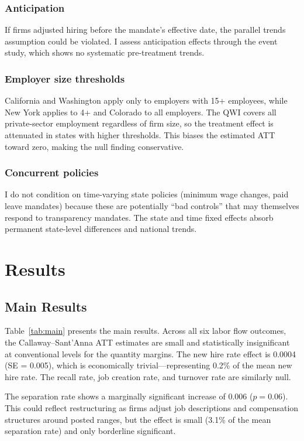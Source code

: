 \documentclass[12pt]{article}
\begin{document}
\subsubsection*{Anticipation} If firms adjusted hiring before the mandate's effective date, the parallel trends assumption could be violated. I assess anticipation effects through the event study, which shows no systematic pre-treatment trends.

\subsubsection*{Employer size thresholds} California and Washington apply only to employers with 15+ employees, while New York applies to 4+ and Colorado to all employers. The QWI covers all private-sector employment regardless of firm size, so the treatment effect is attenuated in states with higher thresholds. This biases the estimated ATT toward zero, making the null finding conservative.

\subsubsection*{Concurrent policies} I do not condition on time-varying state policies (minimum wage changes, paid leave mandates) because these are potentially ``bad controls'' that may themselves respond to transparency mandates. The state and time fixed effects absorb permanent state-level differences and national trends.


\section{Results}

\subsection{Main Results}



Table~\ref{tab:main} presents the main results. Across all six labor flow outcomes, the Callaway--Sant'Anna ATT estimates are small and statistically insignificant at conventional levels for the quantity margins. The new hire rate effect is 0.0004 (SE = 0.005), which is economically trivial---representing 0.2\% of the mean new hire rate. The recall rate, job creation rate, and turnover rate are similarly null.

The separation rate shows a marginally significant increase of 0.006 ($p = 0.06$). This could reflect restructuring as firms adjust job descriptions and compensation structures around posted ranges, but the effect is small (3.1\% of the mean separation rate) and only borderline significant.
\end{document}
